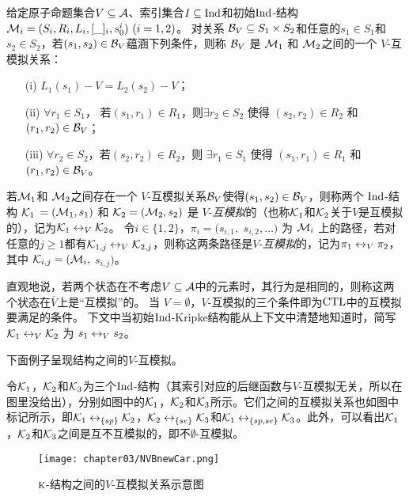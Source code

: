 \begin{definition}[$V$-互模拟]
	\label{def:VInd:bisimulation}
	给定原子命题集合$V\subseteq\cal A$、索引集合$I\subseteq \textrm{Ind}$和初始$\textrm{Ind}$-结构 ${\cal M}_i=(S_i, R_i,L_i, [\_]_i, s_0^i)~(i=1,2)$。
	对关系 ${\cal B}_V \subseteq S_1 \times S_2$和任意的$s_1 \in S_1$和$s_2 \in S_2$，若$(s_1, s_2)\in {\cal B}_V$蕴涵下列条件，则称 ${\cal B}_V$ 是 ${\cal M}_1$ 和 ${\cal M}_2$之间的一个 $V$-互模拟关系：
	\begin{itemize}
		\item[(i)] $L_1(s_1) - V = L_2(s_2) -V$；
		\item[(ii)] $\forall r_1\in S_1$， 若$(s_1, r_1)\in R_1$，则$\exists r_2 \in S_2$ 使得 $(s_2,r_2) \in R_2$ 和 $(r_1, r_2) \in {\cal B}_V$；
		\item[(iii)] $\forall r_2\in S_2$，若$(s_2, r_2)\in R_2$，则 $\exists r_1 \in S_1$ 使得 $(s_1,r_1) \in R_1$ 和 $(r_1, r_2)\in {\cal B}_V$。
	\end{itemize}
\end{definition}


若${\cal M}_1$和 ${\cal M}_2$之间存在一个 $V$-互模拟关系${\cal B}_V$使得$(s_1, s_2)\in {\cal B}_V$，则称两个 $\textrm{Ind}$-结构 ${\cal K}_1$ $= ({\cal M}_1, s_1)$ 和 ${\cal K}_2 = ({\cal M}_2, s_2)$ 是 $V$-{\em 互模拟}的（也称${\cal K}_1$和${\cal K}_2$关于$V$是互模拟的），记为${\cal K}_1 \leftrightarrow_V {\cal K}_2$。
令$i\in \{1,2\}$，$\pi_i=(s_{i,1},$ $s_{i,2},\ldots)$ 为 ${\cal M}_i$ 上的路径，若对任意的$j \ge 1$都有$ {\cal K}_{1,j} \leftrightarrow_V {\cal K}_{2,j}$，则称这两条路径是$V$-{\em 互模拟}的，记为$\pi_1 \leftrightarrow_V \pi_2$，其中 ${\cal K}_{i,j}=({\cal M}_i,$ $s_{i,j})$。


直观地说，若两个状态在不考虑$V\subseteq\cal A$中的元素时，其行为是相同的，则称这两个状态在$\overline{V}$上是“互模拟”的。
当 $V=\emptyset$，$V$-互模拟的三个条件即为$\textrm{CTL}$中的互模拟要满足的条件。
下文中当初始$\textrm{Ind}$-Kripke结构能从上下文中清楚地知道时，简写 ${\cal K}_1 \leftrightarrow_V {\cal K}_2$ 为 $s_1 \leftrightarrow_V s_2$。

下面例子呈现结构之间的$V$-互模拟。
\begin{example}\label{exam:vB}
	令${\cal K}_1$，${\cal K}_2$和${\cal K}_3$为三个$\textrm{Ind}$-结构（其索引对应的后继函数与$V$-互模拟无关，所以在图里没给出），分别如图中的${\cal K}_1$，${\cal K}_2$和${\cal K}_3$所示。它们之间的互模拟关系也如图中标记所示，即${\cal K}_1 \leftrightarrow_{\{sp\}} {\cal K}_2$，${\cal K}_2 \leftrightarrow_{\{se\}} {\cal K}_3$和${\cal K}_1 \leftrightarrow_{\{sp,se\}} {\cal K}_3$。此外，可以看出${\cal K}_1$，${\cal K}_2$和${\cal K}_3$之间是互不互模拟\cite{Baier:PMC:2008}的，即不$\emptyset$-互模拟。
	\begin{figure*}[!htb]
		\centering
		\texttt{[image: chapter03/NVBnewCar.png]}\\
		\caption{$\textsc{k}$-结构之间的$V$-互模拟关系示意图}
		\label{Fig:chapter04:v1uv2}
	\end{figure*}
\end{example}



